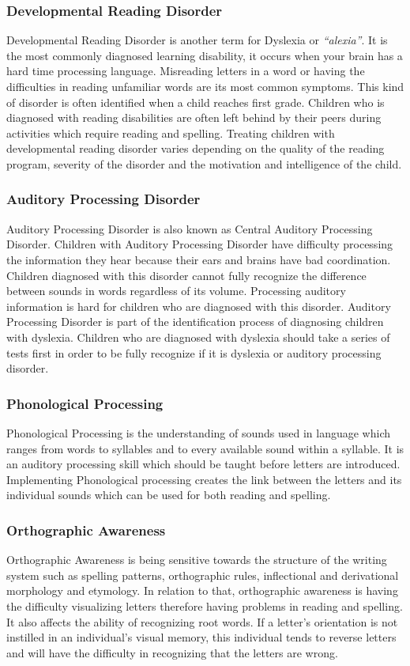 \documentclass[letterpaper, 12pt, oneside]{book}
\begin{document}
\subsubsection{Developmental Reading Disorder}
Developmental Reading Disorder is another term for Dyslexia or \textit{“alexia”}. It is the most commonly diagnosed learning disability, it occurs when your brain has a hard time processing language. Misreading letters in a word or having the difficulties in reading unfamiliar words are its most common symptoms. This kind of disorder is often identified when a child reaches first grade. Children who is diagnosed with reading disabilities are often left behind by their peers during activities which require reading and spelling. Treating children with developmental reading disorder varies depending on the quality of the reading program, severity of the disorder and the motivation and intelligence of the child. 

\subsubsection{Auditory Processing Disorder}
Auditory Processing Disorder is also known as Central Auditory Processing Disorder. Children with Auditory Processing Disorder have difficulty processing the information they hear because their ears and brains have bad coordination. Children diagnosed with this disorder cannot fully recognize the difference between sounds in words regardless of its volume. Processing auditory information is hard for children who are diagnosed with this disorder. Auditory Processing Disorder is part of the identification process of diagnosing children with dyslexia. Children who are diagnosed with dyslexia should take a series of tests first in order to be fully recognize if it is dyslexia or auditory processing disorder. 

\subsubsection{Phonological Processing}
Phonological Processing is the understanding of sounds used in language which ranges from words to syllables and to every available sound within a syllable. It is an auditory processing skill which should be taught before letters are introduced. Implementing Phonological processing creates the link between the letters and its individual sounds which can be used for both reading  and spelling. 

\subsubsection{Orthographic Awareness}
Orthographic Awareness is being sensitive towards the structure of the writing system such as spelling patterns, orthographic rules, inflectional and derivational morphology and etymology. In relation to that, orthographic awareness is having the difficulty visualizing letters therefore having problems in reading and spelling. It also affects the ability of recognizing root words. If a letter’s orientation is not instilled in an individual’s visual memory, this individual tends to reverse letters and will have the difficulty in recognizing that the letters are wrong.
\end{document}
